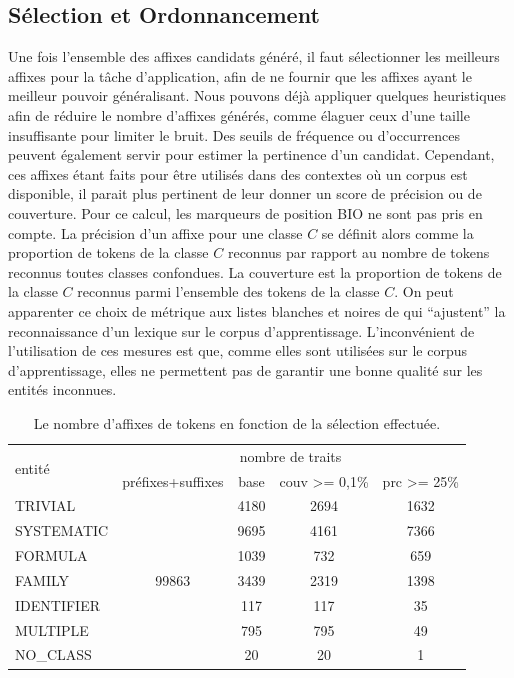 \documentclass[12pt,a4paper,times,twoside,openright]{report}
\begin{document}
        \subsection{Sélection et Ordonnancement}
        \label{subsec:morphology-tree-ordering}
Une fois l'ensemble des affixes candidats généré, il faut sélectionner les meilleurs affixes pour la tâche d'application, afin de ne fournir que les affixes ayant le meilleur pouvoir généralisant. Nous pouvons déjà appliquer quelques heuristiques afin de réduire le nombre d'affixes générés, comme élaguer ceux d'une taille insuffisante pour limiter le bruit. Des seuils de fréquence ou d'occurrences peuvent également servir pour estimer la pertinence d'un candidat. Cependant, ces affixes étant faits pour être utilisés dans des contextes où un corpus est disponible, il parait plus pertinent de leur donner un score de précision ou de couverture. Pour ce calcul, les marqueurs de position BIO ne sont pas pris en compte. La précision d'un affixe pour une classe $C$ se définit alors comme la proportion de tokens de la classe $C$ reconnus par rapport au nombre de tokens reconnus toutes classes confondues. La couverture est la proportion de tokens de la classe $C$ reconnus parmi l'ensemble des tokens de la classe $C$. On peut apparenter ce choix de métrique aux listes blanches et noires de \citet{lowe2014leadmine} qui ``ajustent'' la reconnaissance d'un lexique sur le corpus d'apprentissage. L'inconvénient de l'utilisation de ces mesures est que, comme elles sont utilisées sur le corpus d'apprentissage, elles ne permettent pas de garantir une bonne qualité sur les entités inconnues.

\begin{table}[ht!]
\centering
\begin{tabular}{|l|c|c|c|c|}
\hline
\multirow{2}{*}{entité} & \multicolumn{4}{c|}{nombre de traits} \\
                        & préfixes+suffixes & base     & couv >= 0,1\% & prc >= 25\% \\
\hline
TRIVIAL                 & \multirow{7}{*}{99863} & 4180    & 2694           & 1632 \\
SYSTEMATIC              &                        & 9695    & 4161           & 7366 \\
FORMULA                 &                        & 1039    & 732            & 659  \\
FAMILY                  &                        & 3439    & 2319           & 1398 \\
IDENTIFIER              &                        & 117     & 117            & 35   \\
MULTIPLE                &                        & 795     & 795            & 49   \\
NO\_CLASS               &                        & 20      & 20             & 1    \\
\hline
\end{tabular}
\caption{Le nombre d'affixes de tokens en fonction de la sélection effectuée.}
\label{tab:affixe-selection}
\end{table}
\end{document}

